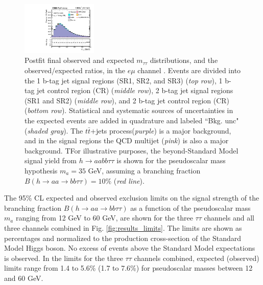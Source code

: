 \begin{figure}[ht]
\begin{center}
        \includegraphics[width=0.32\textwidth]{figures/ch-10-results/em_all_7_post_prelim-yes.pdf}
    \end{center}
    \caption[Postfit final observed and expected $m_{\tau\tau}$ distributions in the $e\mu$ channel.]{Postfit final observed and expected $m_{\tau\tau}$ distributions, and the observed/expected ratios, in the $e\mu$ channel \cite{CMS-AN-20-213}. Events are divided into the 1 b-tag jet signal regions (SR1, SR2, and SR3) (\textit{top row}), 1 b-tag jet control region (CR) (\textit{middle row}), 2 b-tag jet signal regions (SR1 and SR2) (\textit{middle row}), and 2 b-tag jet control region (CR) (\textit{bottom row}). Statistical and systematic sources of uncertainties in the expected events are added in quadrature and labeled ``Bkg. unc" (\textit{shaded gray}). The $t\bar{t}$+jets process(\textit{purple}) is a major background, and in the signal regions the QCD multijet (\textit{pink}) is also a major background. TFor illustrative purposes, the beyond-Standard Model signal yield from $h\rightarrow aa bb\tau\tau$ is shown for the pseudoscalar mass hypothesis $m_a = 35$ GeV, assuming a branching fraction $B(h \rightarrow aa \rightarrow bb\tau\tau) = 10\%$ (\textit{red line}).}
    \label{fig:results_mtt_postfit_emall}
\end{figure}


The 95\% CL expected and observed exclusion limits on the signal strength of the branching fraction $B(h \rightarrow aa \rightarrow bb\tau\tau)$ as a function of the pseudoscalar mass $m_a$ ranging from 12 GeV to 60 GeV, are shown for the three $\tau\tau$ channels and all three channels combined in Fig. \ref{fig:results_limits}. The limits are shown as percentages and normalized to the production cross-section of the Standard Model Higgs boson. No excess of events above the Standard Model expectations is observed. In the limits for the three $\tau\tau$ channels combined, expected (observed) limits range from 1.4 to 5.6\% (1.7 to 7.6\%) for pseudoscalar masses between 12 and 60 GeV.


